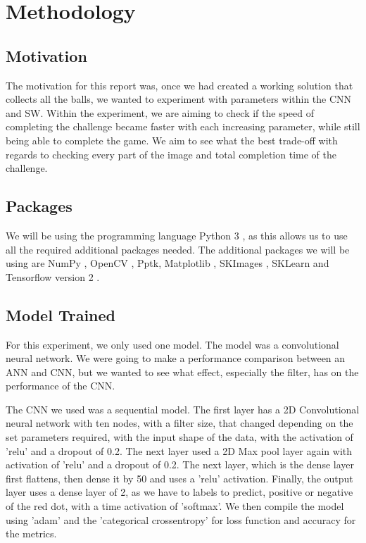 \documentclass[a4paper,10pt]{article}
\begin{document}
\section{Methodology}

\subsection{Motivation}

The motivation for this report was, once we had created a working solution that collects all the balls, we wanted to experiment with parameters within the CNN and SW. Within the experiment, we are aiming to check if the speed of completing the challenge became faster with each increasing parameter, while still being able to complete the game. We aim to see what the best trade-off with regards to checking every part of the image and total completion time of the challenge.

\subsection{Packages}
We will be using the programming language Python 3 \cite{Python}, as this allows us to use all the required additional packages needed. The additional packages we will be using are NumPy \cite{walt2011numpy}, OpenCV \cite{opencv_library}, Pptk, Matplotlib \cite{hunter2007matplotlib}, SKImages \cite{van2014scikit}, SKLearn \cite{sklearn_api} and Tensorflow version 2 \cite{tensorflow2015-whitepaper}.


\subsection{Model Trained}
For this experiment, we only used one model. The model was a convolutional neural network. We were going to make a performance comparison between an ANN and CNN, but we wanted to see what effect, especially the filter, has on the performance of the CNN. 

The CNN we used was a sequential model. The first layer has a 2D Convolutional neural network with ten nodes, with a filter size, that changed depending on the set parameters required, with the input shape of the data, with the activation of 'relu' and a dropout of 0.2. The next layer used a 2D Max pool layer again with activation of 'relu' and a dropout of 0.2. The next layer, which is the dense layer first flattens, then dense it by 50 and uses a 'relu' activation. Finally, the output layer uses a dense layer of 2, as we have to labels to predict, positive or negative of the red dot, with a time activation of 'softmax'. We then compile the model using 'adam' and the 'categorical crossentropy' for loss function and accuracy for the metrics.
\end{document}
